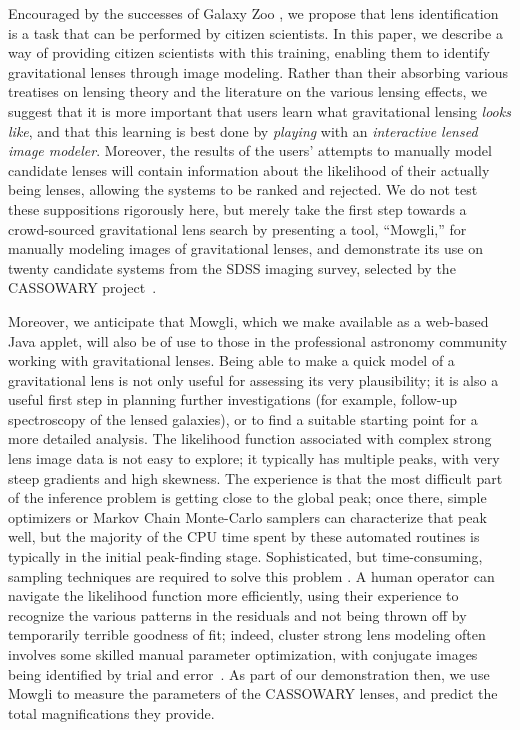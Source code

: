 \documentclass[iop]{emulateapj}
\def\eg{{\it e.g.}\,}
\def\theapplet{{\sc Mowgli}\xspace}
\begin{document}
Encouraged by the successes of Galaxy Zoo \citep[\eg][]{gz1,gz2,gz3}, we propose
that lens identification is a task that can be performed by citizen scientists.
In this paper, we describe a way of providing citizen scientists with this
training, enabling them to identify gravitational lenses through image modeling.
Rather than their  absorbing various treatises on lensing theory and the
literature on the various lensing effects, we suggest that it is more important
that users learn what gravitational lensing {\it looks like}, and that this
learning is best done by {\it playing} with an {\it interactive lensed image
modeler}. Moreover, the results of the users' attempts to manually model
candidate lenses will contain information about the likelihood of their actually
being lenses, allowing the systems to be ranked and rejected. We do not test
these suppositions rigorously here, but merely take the first step towards a
crowd-sourced gravitational lens search by presenting a tool, ``\theapplet,''
for manually modeling images of gravitational lenses, and demonstrate its use on
twenty candidate systems from the SDSS imaging survey, selected by the CASSOWARY
project~\citep{Bel++07,Bel++09}. 

Moreover,  we anticipate that \theapplet, which we make available as a web-based
Java applet, will also be of use to those in the professional astronomy
community working with gravitational lenses. Being able to make a quick model of
a gravitational lens is not only useful for assessing its very plausibility; it
is also a useful first step in planning further investigations (for example,
follow-up spectroscopy of the lensed galaxies), or to find a suitable starting
point for a more detailed analysis. The likelihood function associated with
complex strong lens image data is not easy to explore; it typically has multiple
peaks, with very steep gradients and high skewness. The experience is that the
most difficult part of the inference problem is getting close to the global
peak; once there, simple optimizers or Markov Chain Monte-Carlo  samplers can
characterize that peak well, but the majority of the CPU time spent by these
automated routines is typically in the initial peak-finding stage. 
Sophisticated, but time-consuming, sampling techniques are required  to solve
this problem \citep{Bre++10}.  A human operator can navigate the likelihood
function more efficiently, using their experience to recognize the various
patterns in the residuals and not being thrown off by temporarily terrible
goodness of fit; indeed, cluster strong lens modeling often involves some
skilled manual parameter optimization, with conjugate images being identified by
trial and  error~\citep[\eg][]{Kne++93,Smi++01}.  As part of our demonstration
then, we use \theapplet to measure the parameters of the CASSOWARY lenses, and
predict the total magnifications they provide.
\end{document}
